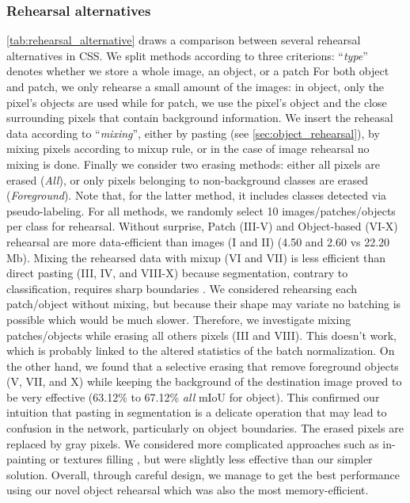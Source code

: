 \subsubsection{Rehearsal alternatives}

\autoref{tab:rehearsal_alternative} draws a comparison between several rehearsal alternatives in
CSS. We split methods according to three criterions: ``\textit{type}'' denotes whether we store a
whole image, an object, or a patch For both object and patch, we only rehearse a small amount of the
images: in object, only the pixel's objects are used while for patch, we use the pixel's object and
the close surrounding pixels that contain background information. We insert the reheasal data
according to ``\textit{mixing}'', either by pasting (see \autoref{sec:object_rehearsal}), by mixing
pixels according to mixup \citep{hingyi2018mixup} rule, or in the case of image rehearsal no mixing
is done. Finally we consider two erasing methods: either all pixels are erased (\textit{All}), or
only pixels belonging to non-background classes are erased (\textit{Foreground}). Note that, for the
latter method, it includes classes detected via pseudo-labeling. For all methods, we randomly select
10 images/patches/objects per class for rehearsal. Without surprise, Patch (III-V) and Object-based
(VI-X) rehearsal are more data-efficient than images (I and II) (4.50 and 2.60 vs 22.20 Mb). Mixing
the rehearsed data with mixup (VI and VII) is less efficient than direct pasting (III, IV, and
VIII-X) because segmentation, contrary to classification, requires sharp boundaries
\citep{chen2020semeda}. We considered rehearsing each patch/object without mixing, but because their
shape may variate no batching is possible which would be much slower. Therefore, we investigate
mixing patches/objects while erasing all others pixels (III and VIII). This doesn't work, which is
probably linked to the altered statistics of the batch normalization. On the other hand, we found
that a selective erasing that remove foreground objects (V, VII, and X) while keeping the background
of the destination image proved to be very effective (63.12\% to 67.12\% \textit{all} mIoU for
object). This confirmed our intuition that pasting in segmentation is a delicate operation that may
lead to confusion in the network, particularly on object boundaries. The erased pixels are replaced
by gray pixels. We considered more complicated approaches such as in-painting
\citep{fang2019instaboost} or textures filling \citep{mallikarjuna2006kth-tips}, but were slightly
less effective than our simpler solution. Overall, through careful design, we manage to get the best
performance using our novel object rehearsal which was also the most memory-efficient.


